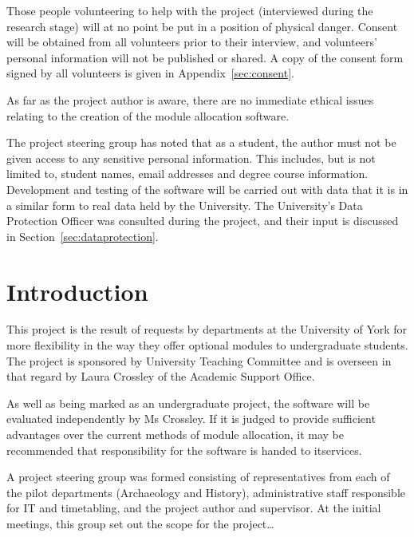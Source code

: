\documentclass[]{scrartcl}
\begin{document}

Those people volunteering to help with the project (interviewed during the
research stage) will at no point be put in a position of physical danger.
Consent will be obtained from all volunteers prior to their interview, and
volunteers' personal information will not be published or shared. A copy of
the consent form signed by all volunteers is given in
Appendix~\ref{sec:consent}.


As far as the project author is aware, there are no immediate ethical issues
relating to the creation of the module allocation software.


The project steering group has noted that as a student, the author must not be
given access to any sensitive personal information. This includes, but is not
limited to, student names, email addresses and degree course information.
Development and testing of the software will be carried out with data that it
is in a similar form to real data held by the University. The University's
Data Protection Officer was consulted during the project, and their input is
discussed in Section~\ref{sec:dataprotection}.

\section{Introduction}


This project is the result of requests by departments at the University of
York for more flexibility in the way they offer optional modules to
undergraduate students. The project is sponsored by University Teaching
Committee and is overseen in that regard by Laura Crossley of the Academic
Support Office.

As well as being marked as an undergraduate project, the software will be
evaluated independently by Ms Crossley. If it is judged to provide sufficient
advantages over the current methods of module allocation, it may be
recommended that responsibility for the software is handed to \gls{itservices}.

A project steering group was formed consisting of representatives from each of
the pilot departments (Archaeology and History), administrative staff
responsible for IT and timetabling, and the project author and supervisor. At
the initial meetings, this group set out the scope for the project…
\end{document}
